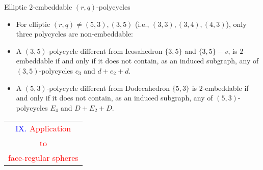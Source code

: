 \documentclass[%
pdf,
colorBG,
slideColor,
]{prosper}
\begin{document}
\begin{slide}{Elliptic $2$-embeddable $(r,q)$-polycycles}
\begin{itemize}
\item For elliptic $(r,q)\ne (5,3),(3,5)$  (i.e., $(3,3),(3,4),(4,3)$), 
only three polycycles are non-embeddable: 
\begin{center}
\begin{minipage}[b]{4.0cm}
\centering
{}\par
\end{minipage}
\begin{minipage}[b]{2.3cm}
\centering
{}\par
\end{minipage}
\begin{minipage}[b]{3.7cm}
\centering
{}\par
\end{minipage}
\end{center}
\item A $(3,5)$-polycycle different from Icosahedron $\{3,5\}$ and 
$\{3,5\}-v$, is $2$-embeddable if and only if it does not contain,
as an induced subgraph, any of $(3,5)$-polycycles $c_3$ and $d+e_2+d$.
\item A $(5,3)$-polycycle different from Dodecahedron $\{5,3\}$ is 
$2$-embeddable if and only if it does not contain, 
as an induced subgraph, any of
$(5,3)$-polycycles $E_4$ and $D + E_2 + D$.
\end{itemize}
\end{slide}






\begin{slide}{}
\begin{center}
{\Huge 
\begin{tabular*}{8cm}{c}
\\[-0.5cm]
\textcolor{blue}{IX. }\textcolor{red}{Application}\\
\textcolor{red}{to}\\
\textcolor{red}{face-regular spheres}
\end{tabular*}
}
\end{center}
\end{slide}
\end{document}

